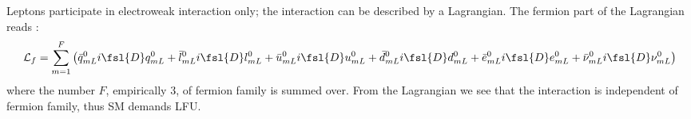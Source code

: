 Leptons participate in electroweak interaction only;
the interaction can be described by a Lagrangian.
The fermion part of the Lagrangian reads \cite{Langacker:2010zza}:
\begin{equation*}
    \mathcal{L}_f = \sum_{m = 1}^F \left(
        \bar{q}^0_{mL} i \fsl{D} q^0_{mL} +
        \bar{l}^0_{mL} i \fsl{D} l^0_{mL} +
        \bar{u}^0_{mL} i \fsl{D} u^0_{mL} +
        \bar{d}^0_{mL} i \fsl{D} d^0_{mL} +
        \bar{e}^0_{mL} i \fsl{D} e^0_{mL} +
        \bar{\nu}^0_{mL} i \fsl{D} \nu^0_{mL}
    \right)
\end{equation*}
where the number $F$, empirically 3, of fermion family is summed over.
From the Lagrangian we see that the interaction is independent of fermion
family, thus SM demands LFU.
